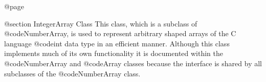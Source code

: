 @page

@section  IntegerArray Class
This class, which is a subclass of @code{NumberArray}, is used to
represent arbitrary shaped arrays of the C language @code{int} data type
in an efficient manner.  Although this class implements much of its own
functionality it is documented within the @code{NumberArray} and
@code{Array} classes because the interface is shared by all subclasses
of the @code{NumberArray} class.







